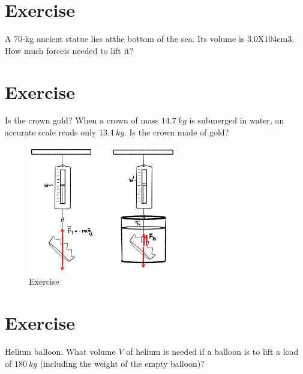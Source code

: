 \documentclass[12pt]{article}
\begin{document}

\section*{Exercise \theexample}

A 70-kg ancient statue lies atthe bottom of the sea.  
Its volume is 3.0X104cm3.  How much forceis needed to lift it?



\section*{Exercise \theexample}

Is the crown gold? When a crown of mass $14.7~kg$
is submerged in water, an accurate scale reads only $13.4~kg$. 
Is the crown made of gold?

\vspace{5mm}

\begin{figure}[h!]
  \begin{center}
    \includegraphics[height=2.2in]{images/arquimedes.jpg}
    \caption{Exercise \theexample }
    \label{4}
  \end{center}
\end{figure}


\section*{Exercise \theexample}


Helium balloon. What volume $V$ of helium is needed if a balloon is to lift a load of $180~kg$ (including the weight of the empty balloon)?
\end{document}
